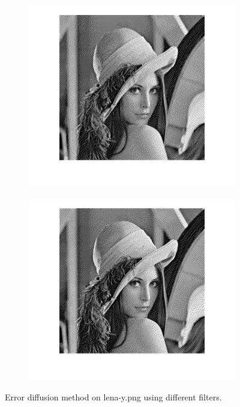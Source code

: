 \documentclass{article}
\begin{document}
\begin{figure}
        \centering
        \begin{subfigure}[b]{0.49\textwidth}
            \includegraphics[width=\textwidth]{Images/lena_error_diffusion_floyd.png}
        \end{subfigure}
        \begin{subfigure}[b]{0.49\textwidth}
            \includegraphics[width=\textwidth]{Images/lena_error_diffusion_stucki.png}
        \end{subfigure}
        \caption{Error diffusion method on \textsf{lena-y.png} using different filters.}
        \label{fig:error_diff_lena}
\end{figure}
\end{document}
